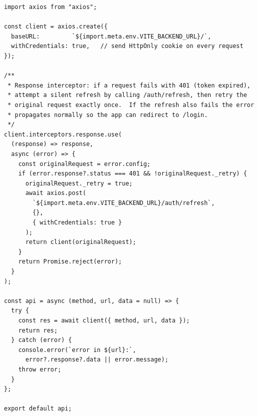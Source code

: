 \documentclass[12pt,onecolumn]{IEEEtran}
\begin{document}
\begin{lstlisting}[caption={API wrapper — Axios client with automatic JWT refresh-token retry}]
import axios from "axios";

const client = axios.create({
  baseURL:         `${import.meta.env.VITE_BACKEND_URL}/`,
  withCredentials: true,   // send HttpOnly cookie on every request
});

/**
 * Response interceptor: if a request fails with 401 (token expired),
 * attempt a silent refresh by calling /auth/refresh, then retry the
 * original request exactly once.  If the refresh also fails the error
 * propagates normally so the app can redirect to /login.
 */
client.interceptors.response.use(
  (response) => response,
  async (error) => {
    const originalRequest = error.config;
    if (error.response?.status === 401 && !originalRequest._retry) {
      originalRequest._retry = true;
      await axios.post(
        `${import.meta.env.VITE_BACKEND_URL}/auth/refresh`,
        {},
        { withCredentials: true }
      );
      return client(originalRequest);
    }
    return Promise.reject(error);
  }
);

const api = async (method, url, data = null) => {
  try {
    const res = await client({ method, url, data });
    return res;
  } catch (error) {
    console.error(`error in ${url}:`,
      error?.response?.data || error.message);
    throw error;
  }
};

export default api;
\end{lstlisting}
\end{document}
